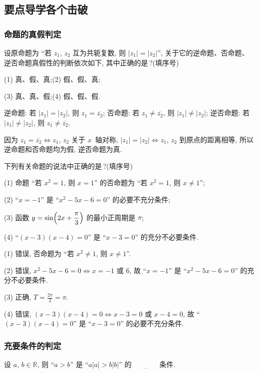   \subsection{要点导学\quad 各个击破}
  \subsubsection{命题的真假判定}
  \begin{example}
    设原命题为 ``若 $z_1$, $z_2$ 互为共轭复数, 则 $|z_1|=|z_2|$'',
    关于它的逆命题、否命题、逆否命题真假性的判断依次如下, 其中正确的是\,?(填序号)
    
    (1) 真、假、真;\qquad (2) 假、假、真;
    
    (3) 真、真、假;\qquad (4) 假、假、假.
  \end{example}

  \beginsolution
    逆命题: 若 $|z_1|=|z_2|$, 则 $z_1=\overline{z_2}$; 
    否命题: 若 $z_1\neq\overline{z_2}$, 则 $|z_1|\neq|z_2|$; 
    逆否命题: 若 $|z_1|\neq|z_2|$, 则 $z_1\neq\overline{z_2}$.
    
    因为 $z_1=\overline{z_2}\Leftrightarrow z_1$, $z_2$ 关于 $x$~轴对称, $|z_1|=|z_2|\Leftrightarrow z_1$, $z_2$ 到原点的距离相等, 所以逆命题和否命题均为假, 逆否命题为真.
  \endsolution
  
  \lianxi
  \begin{exercise}[s]
    下列有关命题的说法中正确的是\,?(填序号)
    
    (1) 命题 ``若 $x^2 =1$, 则 $x=1$'' 的否命题为 ``若 $x^2 =1$, 则 $x\neq 1$'';
    
    (2) ``$x=-1$'' 是 ``$x^2-5x-6=0$'' 的必要不充分条件;
    
    (3) 函数 $y=\sin\Bigl(2x+\dfrac{\pi}3\Bigr)$ 的最小正周期是 $\pi$;
    
    (4) ``$(x-3)(x-4)=0$'' 是 ``$x-3=0$'' 的充分不必要条件.
  \end{exercise}

  \beginsolution
    (1) 错误, 否命题为 ``若 $x^2\neq 1$, 则 $x\neq 1$''.
    
    (2) 错误, $x^2-5x-6=0\Leftrightarrow x=-1$ 或 $6$, 故 ``$x=-1$'' 是 ``$x^2-5x-6=0$'' 的充分不必要条件.
    
    (3) 正确, $T=\frac{2\pi}2= \pi$.
    
    (4) 错误, $(x-3)(x-4)=0\Leftrightarrow x-3=0$ 或 $x-4=0$, 故 ``$(x-3)(x-4)=0$'' 是 ``$x-3=0$'' 的必要不充分条件.
  \endsolution
  
  \subsubsection{充要条件的判定}
  \begin{example}
    设 $a$, $b\in \mathbb{R}$, 则 ``$a>b$'' 是 ``$a|a|>b|b|$'' 
    的$\underline{\qquad\qquad}$条件.
  \end{example}

